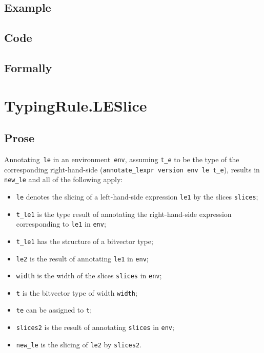 \documentclass{book}
\begin{document}
  \subsection{Example}

  \subsection{Code}

\begin{emptyformal}
    \subsection{Formally}
\end{emptyformal}


\section{TypingRule.LESlice \label{sec:TypingRule.LESlice}}

  \subsection{Prose}
   Annotating~\texttt{le} in an environment~\texttt{env}, assuming
\texttt{t\_e} to be the type of the corresponding right-hand-side
(\texttt{annotate\_lexpr version env le t\_e}), results in \texttt{new\_le} and
all of the following apply:
   \begin{itemize}
   \item \texttt{le} denotes the slicing of a left-hand-side expression \texttt{le1} by the slices \texttt{slices};
   \item \texttt{t\_le1} is the type result of annotating the right-hand-side expression corresponding to \texttt{le1} in \texttt{env};
   \item \texttt{t\_le1} has the structure of a bitvector type;
   \item \texttt{le2} is the result of annotating \texttt{le1} in \texttt{env};
   \item \texttt{width} is the width of the slices \texttt{slices} in \texttt{env};
   \item \texttt{t} is the bitvector type of width \texttt{width};
   \item \texttt{te} can be assigned to \texttt{t};
   \item \texttt{slices2} is the result of annotating \texttt{slices} in \texttt{env};
   \item \texttt{new\_le} is the slicing of \texttt{le2} by \texttt{slices2}.
   \end{itemize}
 
\end{document}
